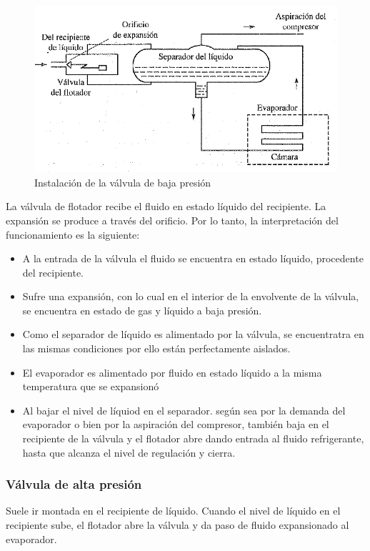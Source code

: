 \begin{figure}[H]
    \centering
    \includegraphics[width=.6\linewidth]{figuras/dispositivos-de-expansion/valvula-expansion-flotador.png}
    \caption{Instalaci\'on de la v\'alvula de baja presi\'on}
    \label{fig:valvula-flotador-baja-presion}
\end{figure}

La v\'alvula de flotador recibe el fluido en estado l\'iquido del recipiente. La expansi\'on se produce a trav\'es del orificio. Por lo tanto, la interpretaci\'on del funcionamiento es la siguiente:

\begin{itemize}
    \item A la entrada de la v\'alvula el fluido se encuentra en estado l\'iquido, procedente del recipiente.
    \item Sufre una expansi\'on, con lo cual en el interior de la envolvente de la v\'alvula, se encuentra en estado de gas y l\'iquido a baja presi\'on.
    \item Como el separador de l\'iquido es alimentado por la v\'alvula, se encuentratra en las mismas condiciones por ello est\'an perfectamente aislados.
    \item El evaporador es alimentado por fluido en estado l\'iquido a la misma temperatura que se expansion\'o
    \item Al bajar el nivel de l\'iquiod en el separador. seg\'un sea por la demanda del evaporador o bien por la aspiraci\'on del compresor, tambi\'en baja en el recipiente de la v\'alvula y el flotador abre dando entrada al fluido refrigerante, hasta que alcanza el nivel de regulaci\'on y cierra.
\end{itemize}

\subsubsection{V\'alvula de alta presi\'on}

Suele ir montada en el recipiente de l\'iquido. Cuando el nivel de l\'iquido en el recipiente sube, el flotador abre la v\'alvula y da paso de fluido expansionado al evaporador.

